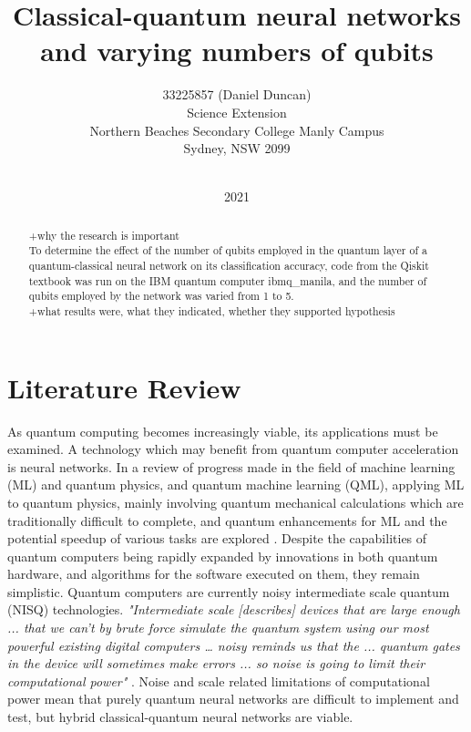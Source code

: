 \documentclass[12pt, a4paper]{article}
\title{Classical-quantum neural networks and varying numbers of qubits}
\date{2021}
\author{ {\hspace{1mm}33225857 (Daniel Duncan)} \\ %
	Science Extension \\
	Northern Beaches Secondary College Manly Campus \\
	Sydney, NSW 2099 \\
	\texttt{} \\ %
}
\begin{document}
\maketitle

\begin{abstract}
+why the research is important\\
To determine the effect of the number of qubits employed in the quantum layer of a quantum-classical neural network on its classification accuracy, code from the Qiskit textbook was run on the IBM quantum computer ibmq\_manila, and the number of qubits employed by the network was varied from 1 to 5.
\\+what results were, what they indicated, whether they supported hypothesis

\end{abstract}

\tableofcontents

\newpage
\section{Literature Review}
As quantum computing becomes increasingly viable, its applications must be examined. A technology which may benefit from quantum computer acceleration is neural networks. In a review of progress made in the field of machine learning (ML) and quantum physics, and quantum machine learning (QML), applying ML to quantum physics, mainly involving quantum mechanical calculations which are traditionally difficult to complete, and quantum enhancements for ML and the potential speedup of various tasks are explored \citep{Dunjko2018}. Despite the capabilities of quantum computers being rapidly expanded by innovations in both quantum hardware, and algorithms for the software executed on them, they remain simplistic. Quantum computers are currently noisy intermediate scale quantum (NISQ) technologies. \emph{"Intermediate scale [describes] devices that are large enough ... that we can't by brute force simulate the quantum system using our most powerful existing digital computers … noisy reminds us that the ... quantum gates in the device will sometimes make errors ... so noise is going to limit their computational power"} \citep{preskill}. Noise and scale related limitations of computational power mean that purely quantum neural networks are difficult to implement and test, but hybrid classical-quantum neural networks are viable.
\end{document}
